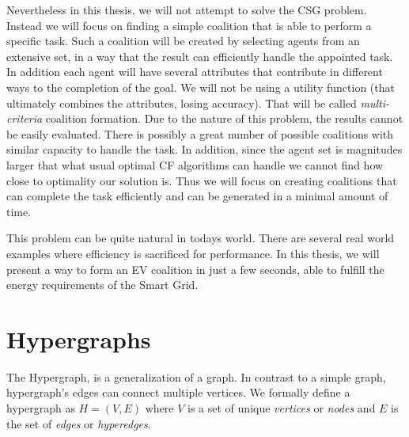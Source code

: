 Nevertheless in this thesis, we will not attempt to solve the CSG problem. Instead we will focus on finding a simple coalition that is able to perform a specific task. Such a coalition will be created by selecting agents from an extensive set, in a way that the result can efficiently handle the appointed task. In addition each agent will have several attributes that contribute in different ways to the completion of the goal. We will not be using a utility function (that ultimately combines the attributes, losing accuracy). That will be called {\em multi-criteria} coalition formation. Due to the nature of this problem, the results cannot be easily evaluated. There is possibly a great number of possible coalitions with similar capacity to handle the task. In addition, since the agent set is magnitudes larger that what usual optimal CF algorithms can handle we cannot find how close to optimality our solution is. Thus we will focus on creating coalitions that can complete the task efficiently and can be generated in a minimal amount of time.

This problem can be quite natural in todays world. There are several real world examples where efficiency is sacrificed for performance. In this thesis, we will present a way to form an EV coalition in just a few seconds, able to fulfill the energy requirements of the Smart Grid.

\section{Hypergraphs}
The Hypergraph, is a generalization of a graph. In contrast to a simple graph, hypergraph's edges can connect multiple vertices. We formally define a hypergraph as $H = (V, E)$ where $V$ is a set of unique {\em vertices} or {\em nodes} and $E$ is the set of {\em edges} or {\em hyperedges}.


